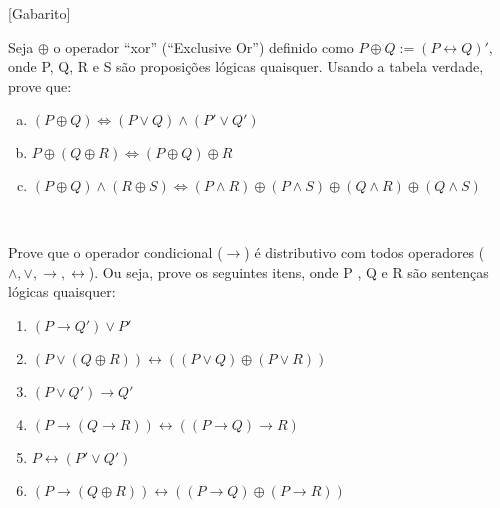 \documentclass[a4paper, 12pt, addpoints]{exam}
\begin{document}
\info\vspace{-1 cm} %
[Gabarito]
\begin{questions}%
  \question Seja $\oplus $ o operador ``xor'' (``Exclusive Or'') definido como $P \oplus Q := (P \leftrightarrow Q)'$, onde P, Q, R e S são proposições lógicas quaisquer. Usando a tabela verdade, prove que:
  \begin{enumerate}[a)]
    \item $(P \oplus Q) \Leftrightarrow (P \lor Q) \land (P' \lor Q')$
    \item $P \oplus (Q \oplus R) \Leftrightarrow (P \oplus Q) \oplus R$
    \item $(P \oplus Q) \land (R \oplus S) \Leftrightarrow (P \land R) \oplus (P \land S) \oplus (Q \land R) \oplus (Q \land S)$
    
  \end{enumerate}
  
   \begin{resp}~
    
  \end{resp}

  \question Prove que o operador condicional ($\rightarrow$) é distributivo com todos operadores ($\land, \lor, \rightarrow, \leftrightarrow$). Ou seja, prove os seguintes itens, onde P , Q e R são sentenças lógicas quaisquer:

  \begin{multicols}{2}
    \begin{enumerate}
      \item $(P \rightarrow Q') \lor P'$
      \item $(P \lor (Q \oplus R)) \leftrightarrow ((P \lor Q) \oplus (P \lor R))$
      \item $(P \lor Q') \rightarrow Q'$
      \item $(P \rightarrow (Q \rightarrow R)) \leftrightarrow ((P \rightarrow Q) \rightarrow R)$
      \item $P \leftrightarrow (P' \lor Q')$
      \item $(P \rightarrow (Q \oplus R)) \leftrightarrow ((P \rightarrow Q) \oplus (P \rightarrow R))$
    \end{enumerate}
  \end{multicols}


\end{questions}
\end{document}
